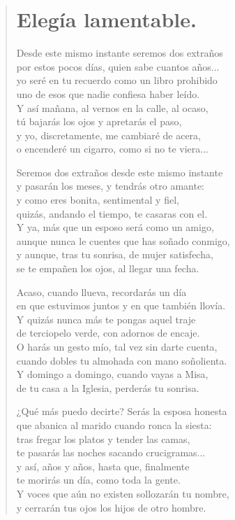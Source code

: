 \documentclass[11pt, portrait, twoside, notitlepage, openright]{book}
\begin{document}
\newpage
\begin{verse}
\begin{center}
\section{Elegía lamentable.}
\end{center}
Desde este mismo instante seremos dos extraños\\
por estos pocos días, quien sabe cuantos años...\\
yo seré en tu recuerdo como un libro prohibido\\
uno de esos que nadie confiesa haber leído.\\
Y así mañana, al vernos en la calle, al ocaso,\\
tú bajarás los ojos y apretarás el paso,\\
y yo, discretamente, me cambiaré de acera,\\
o encenderé un cigarro, como si no te viera...
\newline

Seremos dos extraños desde este mismo instante\\
y pasarán los meses, y tendrás otro amante:\\
y como eres bonita, sentimental y fiel,\\
quizás, andando el tiempo, te casaras con el.\\
Y ya, más que un esposo será como un amigo,\\
aunque nunca le cuentes que has soñado conmigo,\\
y aunque, tras tu sonrisa, de mujer satisfecha,\\
se te empañen los ojos, al llegar una fecha.
\newpage

Acaso, cuando llueva, recordarás un día\\
en que estuvimos juntos y en que también llovía.\\
Y quizás nunca más te pongas aquel traje\\
de terciopelo verde, con adornos de encaje.\\
O harás un gesto mío, tal vez sin darte cuenta,\\
cuando dobles tu almohada con mano soñolienta.\\
Y domingo a domingo, cuando vayas a Misa,\\
de tu casa a la Iglesia, perderás tu sonrisa.
\newline

¿Qué más puedo decirte? Serás la esposa honesta\\
que abanica al marido cuando ronca la siesta:\\
tras fregar los platos y tender las camas,\\
te pasarás las noches sacando crucigramas...\\
y así, años y años, hasta que, finalmente\\
te morirás un día, como toda la gente.\\
Y voces que aún no existen sollozarán tu nombre,\\
y cerrarán tus ojos los hijos de otro hombre.
\newline


\end{verse}
\end{document}

